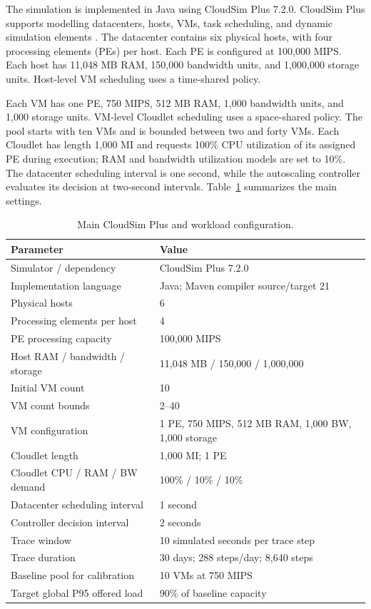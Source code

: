 \documentclass[pdflatex,sn-mathphys-num]{sn-jnl}
\begin{document}
The simulation is implemented in Java using CloudSim Plus 7.2.0. CloudSim Plus supports modelling datacenters, hosts, VMs, task scheduling, and dynamic simulation elements \cite{silvafilho2017cloudsimplus}. The datacenter contains six physical hosts, with four processing elements (PEs) per host. Each PE is configured at 100,000 MIPS. Each host has 11,048 MB RAM, 150,000 bandwidth units, and 1,000,000 storage units. Host-level VM scheduling uses a time-shared policy.

Each VM has one PE, 750 MIPS, 512 MB RAM, 1,000 bandwidth units, and 1,000 storage units. VM-level Cloudlet scheduling uses a space-shared policy. The pool starts with ten VMs and is bounded between two and forty VMs. Each Cloudlet has length 1,000 MI and requests 100\% CPU utilization of its assigned PE during execution; RAM and bandwidth utilization models are set to 10\%. The datacenter scheduling interval is one second, while the autoscaling controller evaluates its decision at two-second intervals. Table~\ref{tab:config} summarizes the main settings.

\begin{table}[t]
\caption{Main CloudSim Plus and workload configuration.}
\label{tab:config}
\centering
\small
\begin{tabular}{p{}p{}}
\toprule
Parameter & Value \\
\midrule
Simulator / dependency & CloudSim Plus 7.2.0 \\
Implementation language & Java; Maven compiler source/target 21 \\
Physical hosts & 6 \\
Processing elements per host & 4 \\
PE processing capacity & 100,000 MIPS \\
Host RAM / bandwidth / storage & 11,048 MB / 150,000 / 1,000,000 \\
Initial VM count & 10 \\
VM count bounds & 2--40 \\
VM configuration & 1 PE, 750 MIPS, 512 MB RAM, 1,000 BW, 1,000 storage \\
Cloudlet length & 1,000 MI; 1 PE \\
Cloudlet CPU / RAM / BW demand & 100\% / 10\% / 10\% \\
Datacenter scheduling interval & 1 second \\
Controller decision interval & 2 seconds \\
Trace window & 10 simulated seconds per trace step \\
Trace duration & 30 days; 288 steps/day; 8,640 steps \\
Baseline pool for calibration & 10 VMs at 750 MIPS \\
Target global P95 offered load & 90\% of baseline capacity \\
\bottomrule
\end{tabular}
\end{table}
\end{document}
